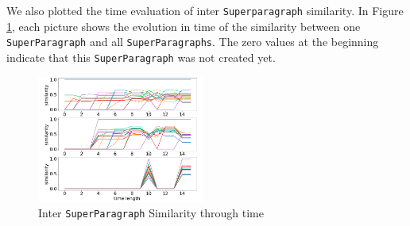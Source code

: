 We also plotted the time evaluation of inter \texttt{Superparagraph} similarity. In Figure \ref{para_similarity}, each picture shows the evolution in time of the similarity between one \texttt{SuperParagraph} and all \texttt{SuperParagraphs}. The zero values at the beginning indicate that this \texttt{SuperParagraph} was not created yet.

\begin{figure}[htp]
    \centering
    \includegraphics[width=0.49\textwidth]{figures/para_similarity.png}
    \caption{Inter \texttt{SuperParagraph} Similarity through time}
    \label{para_similarity}
\end{figure}


